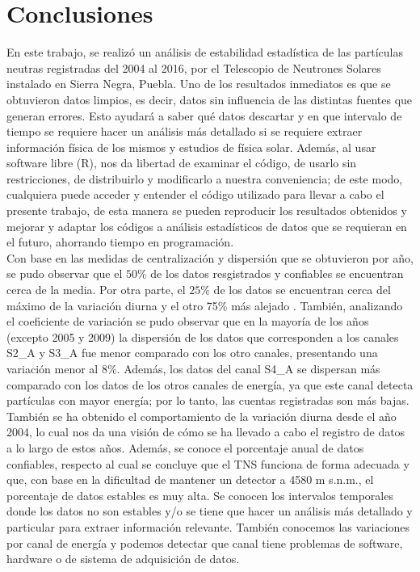 \chapter*{Conclusiones}

En este trabajo, se realizó un análisis de estabilidad estadística de las partículas neutras registradas del 2004 al 2016, por  el Telescopio de Neutrones Solares instalado en Sierra Negra, Puebla. Uno de los resultados inmediatos es que se obtuvieron datos limpios, es decir, datos sin influencia de las distintas fuentes que generan errores. Esto ayudará a saber qué datos descartar y en que intervalo de tiempo se requiere hacer un análisis más detallado si se requiere extraer información física de los mismos y estudios de física solar. Además, al usar software libre (R), nos da libertad de examinar el código, de usarlo sin restricciones, de distribuirlo y modificarlo a nuestra conveniencia; de este modo, cualquiera puede acceder y entender el código utilizado para llevar a cabo el presente trabajo, de esta manera se pueden reproducir los resultados obtenidos y mejorar y adaptar los códigos a análisis estadísticos de datos que se requieran en el futuro, ahorrando tiempo en programación.\\

Con base en las medidas de centralización y dispersión que se obtuvieron por año, se pudo observar que el $50\%$ de los datos resgistrados y confiables se encuentran cerca de la media. Por otra parte, el $25\%$ de los  datos se encuentran cerca del máximo de la variación diurna y el otro 75\% más alejado . También, analizando el coeficiente de variación se pudo observar que en la mayoría de los años (excepto 2005 y 2009)  la dispersión  de los datos que corresponden a los canales S2\_A y S3\_A fue menor comparado con los otro canales, presentando una variación menor al $8\%$. Además,  los datos del canal S4\_A se dispersan más comparado con los datos de los otros canales de energía, ya que este canal detecta partículas con mayor energía; por lo tanto, las cuentas registradas son más bajas.\\

También se ha obtenido el comportamiento de la variación diurna desde el año 2004, lo cual nos da una visión de cómo se ha llevado a cabo el registro de datos a lo largo de estos años. Además, se conoce el porcentaje anual de datos  confiables, respecto al cual se concluye que el TNS funciona de forma adecuada y que, con base en la dificultad de mantener un detector a 4580 m s.n.m., el porcentaje de datos estables es muy alta. Se conocen los intervalos temporales donde los datos no son estables y/o se tiene que hacer un análisis más detallado y particular para extraer información relevante. También conocemos las variaciones por canal de energía y podemos detectar que canal tiene problemas de software, hardware o de sistema de adquisición de datos.\\

